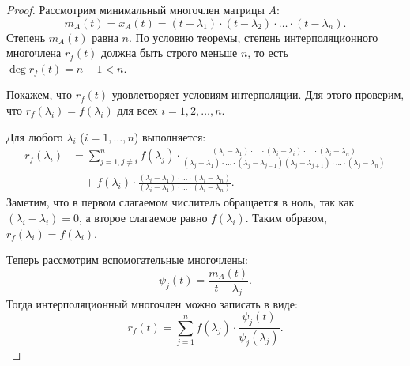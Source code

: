 \begin{proof}

    Рассмотрим минимальный многочлен матрицы \( A \):
    \[
    m_{A}(t) = x_{A}(t) = (t - \lambda_{1}) \cdot (t - \lambda_{2}) \cdot \ldots \cdot (t - \lambda_{n}).
    \]
    Степень \( m_{A}(t) \) равна \( n \). По условию теоремы, степень интерполяционного многочлена \( r_{f}(t) \) должна быть строго меньше \( n \), то есть \( \deg r_{f}(t) = n - 1 < n \).

    Покажем, что \( r_{f}(t) \) удовлетворяет условиям интерполяции. Для этого проверим, что \( r_{f}(\lambda_{i}) = f(\lambda_{i}) \) для всех \( i = 1, 2, \ldots, n \).

   
    Для любого \( \lambda_{i} \) (\( i = 1, \ldots, n \)) выполняется:
        \begin{align*}
        r_{f}(\lambda_{i}) &= \sum_{j = 1, j \neq i}^{n} f(\lambda_{j}) \cdot \frac{(\lambda_{i} - \lambda_{1}) \cdot \ldots \cdot (\lambda_{i} - \lambda_{i}) \cdot \ldots \cdot (\lambda_{i} - \lambda_{n})}{(\lambda_{j} - \lambda_{1}) \cdot \ldots \cdot (\lambda_{j} - \lambda_{j-1}) (\lambda_{j} - \lambda_{j+1}) \cdot \ldots \cdot (\lambda_{j} - \lambda_{n})} \\
        &\quad + f(\lambda_{i}) \cdot \frac{(\lambda_{i} - \lambda_{1}) \cdot \ldots \cdot (\lambda_{i} - \lambda_{n})}{(\lambda_{i} - \lambda_{1}) \cdot \ldots \cdot (\lambda_{i} - \lambda_{n})}.
    \end{align*}
    Заметим, что в первом слагаемом числитель обращается в ноль, так как \\\( (\lambda_{i} - \lambda_{i}) = 0 \), а второе слагаемое равно \( f(\lambda_{i}) \). Таким образом, \( r_{f}(\lambda_{i}) = f(\lambda_{i}) \).

    Теперь рассмотрим вспомогательные многочлены:
    \[
    \psi_{j}(t) = \frac{m_{A}(t)}{t - \lambda_{j}}.
    \]
    Тогда интерполяционный многочлен можно записать в виде:
    \[
    r_{f}(t) = \sum_{j=1}^{n} f(\lambda_{j}) \cdot \frac{\psi_{j}(t)}{\psi_{j}(\lambda_{j})}.
    \]
\end{proof}

